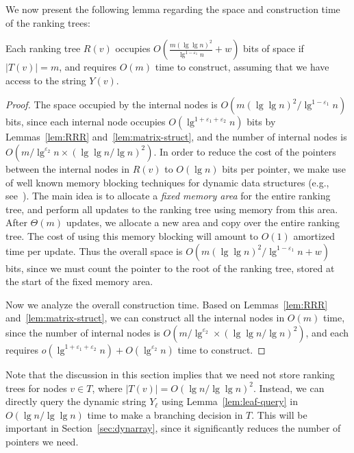 \documentclass{llncs}
\begin{document}
We now present the following lemma regarding the space and
construction time of the ranking trees:

\begin{lemma}
\label{lem:space-2}
Each ranking tree $R(v)$ occupies $O\left( \frac{m(\lg \lg
  n)^2}{\lg^{1 - \varepsilon_1} n} + w \right)$ bits of space if
$|T(v)| = m$, and requires $O(m)$ time to construct, assuming that we
have access to the string $Y(v)$.
\end{lemma}

\begin{proof}
The space occupied by the internal nodes is $O(m (\lg \lg n)^2 /
\lg^{1-\varepsilon_1}n)$ bits, since each internal node occupies
$O(\lg^{1+\varepsilon_1+\varepsilon_2} n)$ bits by
Lemmas~\ref{lem:RRR} and~\ref{lem:matrix-struct}, and the number of
internal nodes is $O(m/\lg^{\varepsilon_2}n \times (\lg \lg n / \lg
n)^2)$.  In order to reduce the cost of the pointers between the
internal nodes in $R(v)$ to $O(\lg n)$ bits per pointer, we make use
of well known memory blocking techniques for dynamic data structures
(e.g., see~\cite[Appendix J]{HM10a}).  The main idea is to allocate a
\emph{fixed memory area} for the entire ranking tree, and perform all
updates to the ranking tree using memory from this area.  After
$\Theta(m)$ updates, we allocate a new area and copy over the entire
ranking tree.  The cost of using this memory blocking will amount to
$O(1)$ amortized time per update. Thus the overall space is $O(m (\lg
\lg n)^2 / \lg^{1-\varepsilon_1}n + w)$ bits, since we must count the
pointer to the root of the ranking tree, stored at the start of the
fixed memory area.

Now we analyze the overall construction time.  Based on
Lemmas~\ref{lem:RRR} and~\ref{lem:matrix-struct}, we can construct all
the internal nodes in $O(m)$ time, since the number of internal nodes
is $O(m/\lg^{\varepsilon_2} \times (\lg \lg n / \lg n)^2)$, and each
requires $o(\lg^{1+\varepsilon_1 + \varepsilon_2}n) +
O(\lg^{\varepsilon_2} n)$ time to construct. 
\end{proof}

\begin{remark}
Note that the discussion in this section implies that we need not
store ranking trees for nodes $v\in T$, where $|T(v)| = O(\lg n / \lg
\lg n)^2$.  Instead, we can directly query the dynamic string $Y_\ell$
using Lemma~\ref{lem:leaf-query} in $O(\lg n / \lg \lg n)$ time to
make a branching decision in $T$.  This will be important in
Section~\ref{sec:dynarray}, since it significantly reduces the number
of pointers we need.
\end{remark}
\end{document}
